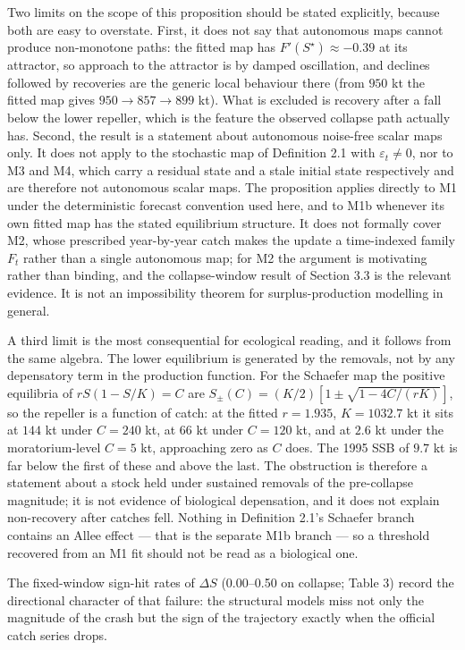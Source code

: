 \documentclass[11pt]{article}
\begin{document}
Two limits on the scope of this proposition should be stated
explicitly, because both are easy to overstate. First, it does not say
that autonomous maps cannot produce non-monotone paths: the fitted map
has \(F'(S^\star) \approx -0.39\) at its attractor, so approach to the
attractor is by damped oscillation, and declines followed by recoveries
are the generic local behaviour there (from \(950\) kt the fitted map
gives \(950 \to 857 \to 899\) kt). What is excluded is recovery after a
fall below the lower repeller, which is the feature the observed
collapse path actually has. Second, the result is a statement about
autonomous noise-free scalar maps only. It does not apply to the
stochastic map of Definition 2.1 with \(\varepsilon_t \neq 0\), nor to
M3 and M4, which carry a residual state and a stale initial state
respectively and are therefore not autonomous scalar maps. The
proposition applies directly to M1 under the deterministic forecast
convention used here, and to M1b whenever its own fitted map has the
stated equilibrium structure. It does not formally cover M2, whose
prescribed year-by-year catch makes the update a time-indexed family
\(F_t\) rather than a single autonomous map; for M2 the argument is
motivating rather than binding, and the collapse-window result of
Section 3.3 is the relevant evidence. It is not an impossibility
theorem for surplus-production modelling in general.

A third limit is the most consequential for ecological reading, and it
follows from the same algebra. The lower equilibrium is generated by the
removals, not by any depensatory term in the production function. For
the Schaefer map the positive equilibria of \(rS(1-S/K)=C\) are
\(S_{\pm}(C) = (K/2)\left[1 \pm \sqrt{1-4C/(rK)}\right]\), so the
repeller is a function of catch: at the fitted \(r = 1.935\),
\(K = 1032.7\) kt it sits at \(144\) kt under \(C = 240\) kt, at
\(66\) kt under \(C = 120\) kt, and at \(2.6\) kt under the
moratorium-level \(C = 5\) kt, approaching zero as \(C\) does. The
1995 SSB of \(9.7\) kt is far below the first of these and above the
last. The obstruction is therefore a statement about a stock held under
sustained removals of the pre-collapse magnitude; it is not evidence of
biological depensation, and it does not explain non-recovery after
catches fell. Nothing in Definition 2.1's Schaefer branch contains an
Allee effect --- that is the separate M1b branch --- so a threshold
recovered from an M1 fit should not be read as a biological one.

The fixed-window sign-hit rates of \(\Delta S\) (0.00--0.50 on collapse;
Table 3) record the directional character of that failure: the
structural models miss not only the magnitude of the crash but the sign
of the trajectory exactly when the official catch series drops.
\end{document}
